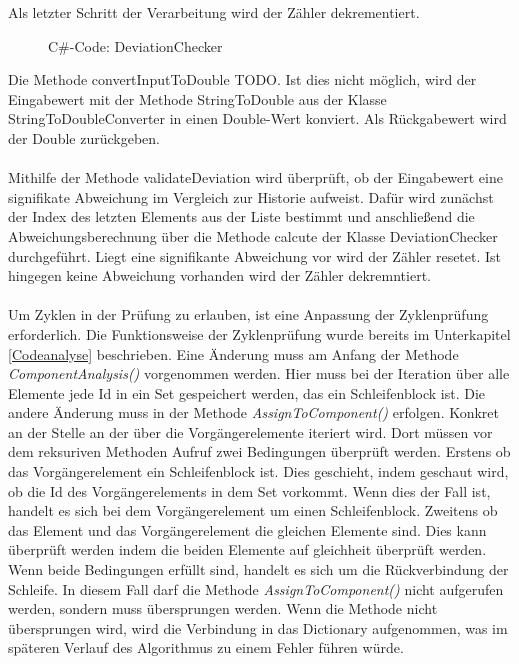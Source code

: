     Als letzter Schritt der Verarbeitung wird der Zähler dekrementiert.
    \newpage
    \begin{figure}[H]
        \centering
                
        \caption{C\#-Code: DeviationChecker}
    \end{figure}  
    Die Methode convertInputToDouble TODO. Ist dies nicht möglich, wird der Eingabewert mit der Methode StringToDouble aus der Klasse StringToDoubleConverter in einen Double-Wert konviert.
    Als Rückgabewert wird der Double zurückgeben.\\
    \\
    Mithilfe der Methode validateDeviation wird überprüft, ob der Eingabewert eine signifikate Abweichung im Vergleich zur Historie aufweist.
    Dafür wird zunächst der Index des letzten Elements aus der Liste bestimmt und anschließend die Abweichungsberechnung über die Methode calcute der Klasse DeviationChecker durchgeführt.
    Liegt eine signifikante Abweichung vor wird der Zähler resetet. Ist hingegen keine Abweichung vorhanden wird der Zähler dekremntiert.\\
    \\
    Um Zyklen in der Prüfung zu erlauben, ist eine Anpassung der Zyklenprüfung erforderlich.
    Die Funktionsweise der Zyklenprüfung wurde bereits im Unterkapitel \ref{Codeanalyse} beschrieben.
    Eine Änderung muss am Anfang der Methode \textit{ComponentAnalysis()} vorgenommen werden.
    Hier muss bei der Iteration über alle Elemente jede Id in ein Set gespeichert werden, das ein Schleifenblock ist.
    Die andere Änderung muss in der Methode \textit{AssignToComponent()} erfolgen.
    Konkret an der Stelle an der über die Vorgängerelemente iteriert wird.
    Dort müssen vor dem reksuriven Methoden Aufruf zwei Bedingungen überprüft werden.
    Erstens ob das Vorgängerelement ein Schleifenblock ist.
    Dies geschieht, indem geschaut wird, ob die Id des Vorgängerelements in dem Set vorkommt. 
    Wenn dies der Fall ist, handelt es sich bei dem Vorgängerelement um einen Schleifenblock.
    Zweitens ob das Element und das Vorgängerelement die gleichen Elemente sind.
    Dies kann überprüft werden indem die beiden Elemente auf gleichheit überprüft werden.
    Wenn beide Bedingungen erfüllt sind, handelt es sich um die Rückverbindung der Schleife. 
    In diesem Fall darf die Methode \textit{AssignToComponent()} nicht aufgerufen werden, sondern muss übersprungen werden.
    Wenn die Methode nicht übersprungen wird, wird die Verbindung in das Dictionary aufgenommen, was im späteren Verlauf des Algorithmus zu einem Fehler führen würde.
